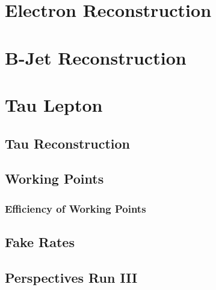 \section{Electron Reconstruction}
\label{sec:Electron}

\section{B-Jet Reconstruction}
\label{sec:BJet}



\section{Tau Lepton}
\label{sec:Tau}


\subsection{Tau Reconstruction}
\label{subsec:TauReconstruction}

\subsection{Working Points}
\label{subsec:wp}

\subsubsection{Efficiency of Working Points}
\label{subsubsec:Eff_WP}

\subsection{Fake Rates}
\label{subsec:FakeRates}

\subsection{Perspectives Run III}
\label{subsec:Perspectives} 